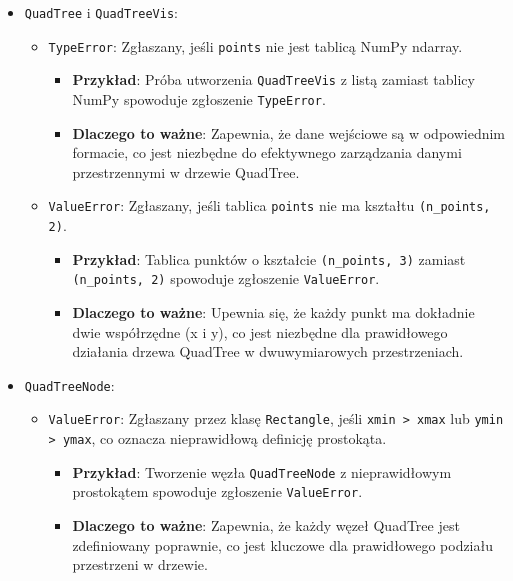 \documentclass[12pt]{article}
\begin{document}
\begin{itemize}
    \item \texttt{QuadTree} i \texttt{QuadTreeVis}:
    \begin{itemize}
        \item \texttt{TypeError}: Zgłaszany, jeśli \texttt{points} nie jest tablicą NumPy ndarray.
        \begin{itemize}
            \item \textbf{Przykład}: Próba utworzenia \texttt{QuadTreeVis} z listą zamiast tablicy NumPy spowoduje zgłoszenie \texttt{TypeError}.
            \item \textbf{Dlaczego to ważne}: Zapewnia, że dane wejściowe są w odpowiednim formacie, co jest niezbędne do efektywnego zarządzania danymi przestrzennymi w drzewie QuadTree.
        \end{itemize}
        
        \item \texttt{ValueError}: Zgłaszany, jeśli tablica \texttt{points} nie ma kształtu \texttt{(n\_points, 2)}.
        \begin{itemize}
            \item \textbf{Przykład}: Tablica punktów o kształcie \texttt{(n\_points, 3)} zamiast \texttt{(n\_points, 2)} spowoduje zgłoszenie \texttt{ValueError}.
            \item \textbf{Dlaczego to ważne}: Upewnia się, że każdy punkt ma dokładnie dwie współrzędne (x i y), co jest niezbędne dla prawidłowego działania drzewa QuadTree w dwuwymiarowych przestrzeniach.
        \end{itemize}
    \end{itemize}
    
    \item \texttt{QuadTreeNode}:
    \begin{itemize}
        \item \texttt{ValueError}: Zgłaszany przez klasę \texttt{Rectangle}, jeśli \texttt{xmin > xmax} lub \texttt{ymin > ymax}, co oznacza nieprawidłową definicję prostokąta.
        \begin{itemize}
            \item \textbf{Przykład}: Tworzenie węzła \texttt{QuadTreeNode} z nieprawidłowym prostokątem spowoduje zgłoszenie \texttt{ValueError}.
            \item \textbf{Dlaczego to ważne}: Zapewnia, że każdy węzeł QuadTree jest zdefiniowany poprawnie, co jest kluczowe dla prawidłowego podziału przestrzeni w drzewie.
        \end{itemize}
    \end{itemize}
\end{itemize}
\end{document}
